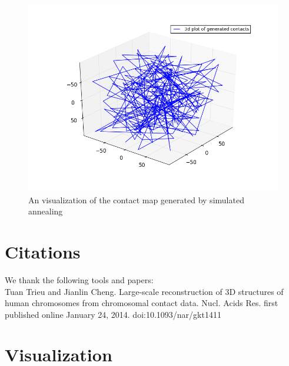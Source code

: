 \documentclass{article}
\begin{document}
\begin{figure}[H]
\begin{center}
\includegraphics[width=\textwidth]{sa_150}
\caption{An visualization of the contact map generated by simulated annealing}
\label{Fig:blosum}
\end{center}
\end{figure}

\section{Citations}

We thank the following tools and papers: \\

Tuan Trieu and Jianlin Cheng.  Large-scale reconstruction of 3D structures of human chromosomes from chromosomal contact data.  Nucl. Acids Res. first published online January 24, 2014. doi:10.1093/nar/gkt1411


\section{Visualization}
\end{document}
